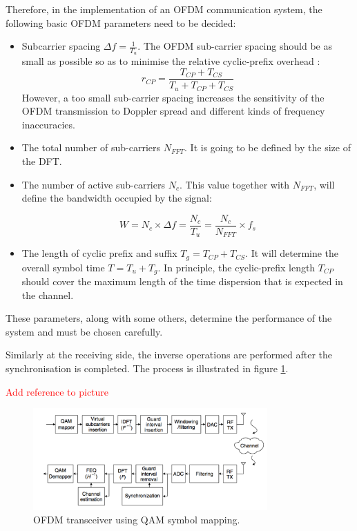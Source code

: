 \documentclass[12pt,a4paper,openright]{report}
\begin{document}
Therefore, in the implementation of an OFDM communication system, the following basic OFDM parameters need to be decided:

\begin{itemize}
\item Subcarrier spacing $\Delta f = \frac{1}{T_u}$. The OFDM sub-carrier spacing should be as small as possible so as to minimise the relative cyclic-prefix overhead :
 \begin{equation}
 r_{CP}=\frac{T_{CP}+T_{CS}}{T_u + T_{CP} + T_{CS}}
 \end{equation}
 However, a too small sub-carrier spacing increases the sensitivity of the OFDM transmission to Doppler spread and different kinds of frequency inaccuracies.

\item The total number of sub-carriers $N_{FFT}$. It is going to be defined by the size of the DFT.
\item The number of active sub-carriers $N_c$. This value together with $N_{FFT}$, will define the bandwidth occupied by the signal:

\begin{equation}\label{eq:OFDMbw}
W = N_c \times \Delta f = \frac{N_c}{T_u}=\frac{N_c}{N_{FFT}}\times f_s
\end{equation}

\item The length of cyclic prefix and suffix  $T_g = T_{CP} + T_{CS}$. It will determine the overall symbol time $T = T_u + T_g$. In principle, the cyclic-prefix length $T_{CP}$ should cover the maximum length of the time dispersion that is expected in the channel. 
\end{itemize}

These parameters, along with some others, determine the performance of the system and must be chosen carefully. 

Similarly at the receiving side, the inverse operations are performed after the synchronisation is completed. The process is illustrated in figure \ref{fig:ofdmtransceiver}.

\textcolor{red}{Add reference to picture}
 \begin{figure}[H]
  \centering
    \includegraphics[width=0.8\textwidth]{ofdmtransceiver.pdf}
    \caption[OFDM transceiver using QAM symbol mapping.]{OFDM transceiver using QAM symbol mapping.}
    \label{fig:ofdmtransceiver}
\end{figure}
\end{document}
